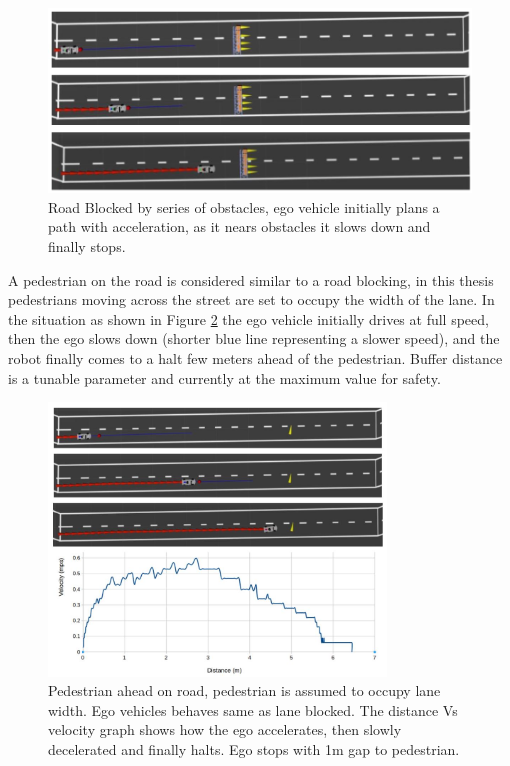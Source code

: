 \begin{figure}
    \centering
    \includegraphics[width=1.0\textwidth]{Images/evaluation/stopping_lane_blocked.jpg}
    \caption{Road Blocked by series of obstacles, ego vehicle initially plans a path with acceleration, as it nears obstacles it slows down and finally stops.}
    \label{road_blocked}
\end{figure}

A pedestrian on the road is considered similar to a road blocking, in this thesis pedestrians moving across the street are set to occupy the width of the lane. In the situation as shown in Figure \ref{pedestrian_ahead} the ego vehicle initially drives at full speed, then the ego slows down (shorter blue line representing a slower speed), and the robot finally comes to a halt few meters ahead of the pedestrian. Buffer distance is a tunable parameter and currently at the maximum value for safety. 

\begin{figure}
    \centering
    \includegraphics[width=0.8\textwidth]{Images/evaluation/stopping_pedestrian.jpg}
    \caption{Pedestrian ahead on road, pedestrian is assumed to occupy lane width. Ego vehicles behaves same as lane blocked. The distance Vs velocity graph shows how the ego accelerates, then slowly decelerated and finally halts. Ego stops with 1m gap to pedestrian.}
    \label{pedestrian_ahead}
\end{figure}


